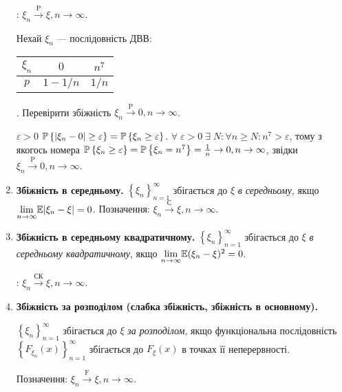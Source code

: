 \begin{enumerate}
    : $\xi_n \overset{\mathrm{P}}{\longrightarrow} \xi, n \to \infty$.
    \begin{example}
        Нехай $\xi_n$ --- послідовність ДВВ: 
        \begin{tabular}{|c|c|c|}
            \hline
            $\xi_n$ & $0$ & $n^7$ \\
            \hline
            $p$ & $1-1/n$ & $1/n$ \\
            \hline
        \end{tabular}.
        Перевірити збіжність $\xi_n \overset{\mathrm{P}}{\longrightarrow} 0, n \to \infty$.
        
         $\varepsilon >0$ $\P\left\{|\xi_n -0| \geq \varepsilon\right\} = \P\left\{ \xi_n \geq \varepsilon\right\}$.
        $\forall \; \varepsilon >0 \; \exists \; N: \forall n\geq N:n^7 > \varepsilon$, тому з якогось номера
        $\P\left\{ \xi_n \geq \varepsilon\right\} = \P\left\{ \xi_n = n^7 \right\} = \frac{1}{n} \to 0, n\to\infty$, звідки $\xi_n \overset{\mathrm{P}}{\longrightarrow} 0, n \to \infty$.
    \end{example}
    \item \textbf{Збіжність в середньому.}
    \noindent$\left\{ \xi_n\right\}_{n=1}^{\infty}$ збігається до $\xi$ \emph{в середньому},
    якщо $\underset{n \to \infty}{\lim} \E|\xi_n - \xi| = 0$.
    Позначення: $\xi_n \overset{\text{С}}{\longrightarrow} \xi, n \to \infty$.
    \item \textbf{Збіжність в середньому квадратичному.}
    \noindent$\left\{ \xi_n\right\}_{n=1}^{\infty}$ збігається до $\xi$ \emph{в середньому квадратичному},
    якщо $\underset{n \to \infty}{\lim} \E(\xi_n - \xi)^2 = 0$.
    
    : $\xi_n \overset{\text{СК}}{\longrightarrow} \xi, n \to \infty$.
    \item \textbf{Збіжність за розподілом (слабка збіжність, збіжність в основному).}

    \noindent$\left\{ \xi_n\right\}_{n=1}^{\infty}$ збігається до $\xi$ \emph{за розподілом}, якщо функціональна послідовність
    $\left\{ F_{\xi_n} (x)\right\}_{n=1}^{\infty}$ збігається до $F_{\xi}(x)$ в точках її неперервності.

    Позначення: $\xi_n \overset{\mathrm{F}}{\longrightarrow} \xi, n \to \infty$.


\end{enumerate}
